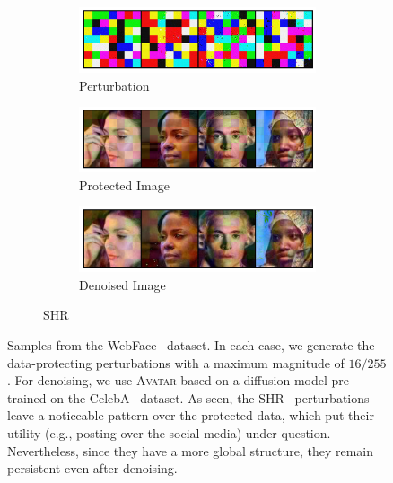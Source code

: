 \documentclass[conference]{IEEEtran}
\theoremstyle{definition}
\theoremstyle{remark}
\theoremstyle{proposition}
\begin{document}
\begin{figure}[tb!]
    \ContinuedFloat
    \begin{subfigure}{1.0\textwidth}
        \begin{center}
        	\begin{subfigure}{.5\textwidth}
        		\centering
        		\includegraphics[width=1.0\textwidth, valign=c]{webface/pert_shr16.jpg}
                \caption*{Perturbation}
        	\end{subfigure}
        \end{center}
    	\begin{subfigure}{.5\textwidth}
    		\centering
    		\includegraphics[width=1.0\textwidth, valign=c]{webface/pois_shr16.jpg}
            \caption*{Protected Image}
    	\end{subfigure}
    	\begin{subfigure}{.5\textwidth}
    		\centering
    		\includegraphics[width=1.0\textwidth, valign=c]{webface/san_shr16.jpg}
            \caption*{Denoised Image}
    	\end{subfigure}
	\caption{SHR~\citep{yu2022shr}}
    \end{subfigure}
    \caption{Samples from the WebFace~\citep{yi2014} dataset.
             In each case, we generate the data-protecting perturbations with a maximum magnitude of $16/255$.
             For denoising, we use \textsc{Avatar} based on a diffusion model pre-trained on the CelebA~\citep{liu2015deep} dataset.
             As seen, the SHR~\citep{yu2022shr} perturbations leave a noticeable pattern over the protected data, which put their utility (e.g., posting over the social media) under question.
             Nevertheless, since they have a more global structure, they remain persistent even after denoising.
             }
	\label{fig:WebFace_Samples}
\end{figure}
\end{document}
